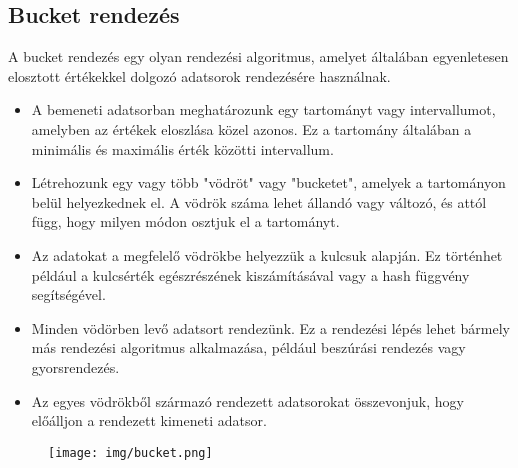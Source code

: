 \documentclass[margin=0px]{article}
\begin{document}
\subsection{Bucket rendezés}
A bucket rendezés egy olyan rendezési algoritmus, amelyet általában egyenletesen elosztott értékekkel dolgozó adatsorok rendezésére használnak.
\begin{itemize}
    \item A bemeneti adatsorban meghatározunk egy tartományt vagy intervallumot, amelyben az értékek eloszlása közel azonos. Ez a tartomány általában a minimális és maximális érték közötti intervallum.
    \item Létrehozunk egy vagy több "vödröt" vagy "bucketet", amelyek a tartományon belül helyezkednek el. A vödrök száma lehet állandó vagy változó, és attól függ, hogy milyen módon osztjuk el a tartományt.
    \item Az adatokat a megfelelő vödrökbe helyezzük a kulcsuk alapján. Ez történhet például a kulcsérték egészrészének kiszámításával vagy a hash függvény segítségével.
    \item Minden vödörben levő adatsort rendezünk. Ez a rendezési lépés lehet bármely más rendezési algoritmus alkalmazása, például beszúrási rendezés vagy gyorsrendezés.
    \item Az egyes vödrökből származó rendezett adatsorokat összevonjuk, hogy előálljon a rendezett kimeneti adatsor.
\end{itemize}
\begin{figure}[H]
    \centering
    \texttt{[image: img/bucket.png]}
\end{figure}
\end{document}
